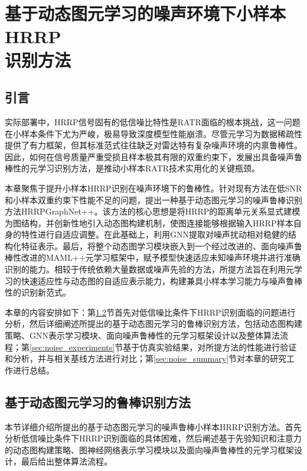 \chapter[基于动态图元学习的噪声环境下小样本HRRP识别方法]{基于动态图元学习的噪声环境下小样本HRRP\protect\\ 识别方法}
\label{chap:noise_robust}

\section{引言}
\label{sec:noise_intro}

实际部署中，HRRP信号固有的低信噪比特性是RATR面临的根本挑战，这一问题在小样本条件下尤为严峻，极易导致深度模型性能崩溃。尽管元学习为数据稀疏性提供了有力框架，但其标准范式往往缺乏对雷达特有复杂噪声环境的内禀鲁棒性。因此，如何在信号质量严重受损且样本极其有限的双重约束下，发展出具备噪声鲁棒性的元学习识别方法，是推动小样本RATR技术实用化的关键瓶颈。

本章聚焦于提升小样本HRRP识别在噪声环境下的鲁棒性。针对现有方法在低SNR和小样本双重约束下性能不足的问题，提出一种基于动态图元学习的噪声鲁棒识别方法HRRPGraphNet++。该方法的核心思想是将HRRP的距离单元关系显式建模为图结构，并创新性地引入动态图构建机制，使图连接能够根据输入HRRP样本自身的特性进行自适应调整。在此基础上，利用GNN提取对噪声扰动相对稳健的结构化特征表示。最后，将整个动态图学习模块嵌入到一个经过改进的、面向噪声鲁棒性改进的MAML++元学习框架中，赋予模型快速适应未知噪声环境并进行准确识别的能力。相较于传统依赖大量数据或噪声先验的方法，所提方法旨在利用元学习的快速适应性与动态图的自适应表示能力，构建兼具小样本学习能力与噪声鲁棒性的识别新范式。

本章的内容安排如下：第\ref{sec:noise_methodology}节首先对低信噪比条件下HRRP识别面临的问题进行分析，然后详细阐述所提出的基于动态图元学习的鲁棒识别方法，包括动态图构建策略、GNN表示学习模块、面向噪声鲁棒性的元学习框架设计以及整体算法流程；第\ref{sec:noise_experiments}节基于仿真实验结果，对所提方法的性能进行验证和分析，并与相关基线方法进行对比；第\ref{sec:noise_summary}节对本章的研究工作进行总结。

\section{基于动态图元学习的鲁棒识别方法}
\label{sec:noise_methodology}

本节详细介绍所提出的基于动态图元学习的噪声鲁棒小样本HRRP识别方法。首先分析低信噪比条件下HRRP识别面临的具体困难，然后阐述基于先验知识和注意力的动态图构建策略、图神经网络表示学习模块以及面向噪声鲁棒性的元学习框架设计，最后给出整体算法流程。

